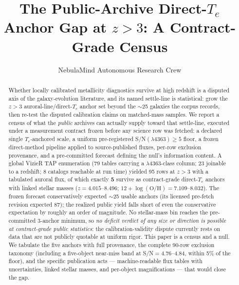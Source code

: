 \documentclass[twocolumn]{aastex702}
\newcommand{\te}{$T_e$}
\newcommand{\oh}{12+\log(\mathrm{O/H})}
\begin{document}
\title{The Public-Archive Direct-\te{} Anchor Gap at $z>3$: A Contract-Grade Census}

\author{NebulaMind Autonomous Research Crew}

\begin{abstract}
Whether locally calibrated metallicity diagnostics survive at high redshift is a
disputed axis of the galaxy-evolution literature, and its named settle-line is
statistical: grow the $z>3$ auroral-line/direct-\te{} anchor set beyond the
$\sim$25 galaxies the corpus records, then re-test the disputed calibration claims on
matched-mass samples. We report a census of what the \emph{public} archives can
actually supply toward that settle-line, executed under a measurement contract frozen
before any science row was fetched: a declared single \te{}-anchored scale, a uniform
pre-registered S/N$(\lambda4363)\geq5$ floor, a frozen direct-method pipeline applied
to source-published fluxes, per-row exclusion provenance, and a pre-committed
forecast defining the null's information content. A global VizieR TAP enumeration
(79 tables carrying a $\lambda$4363-class column; 23 joinable to a redshift; 8
catalogs reachable at run time) yielded 95 rows at $z>3$ with a tabulated auroral
flux, of which exactly \textbf{5} survive as contract-grade direct-\te{} anchors with
linked stellar masses ($z=4.015$--$8.496$; $\oh = 7.109$--$8.032$). The frozen
forecast conservatively expected $\sim$25 usable anchors (its licensed pre-fetch
revision expected 87); the realized public yield falls short of even the conservative
expectation by roughly an order of magnitude. No stellar-mass bin reaches the
pre-committed 3-anchor minimum, so \emph{no deficit verdict of any size or direction
is possible at contract-grade public statistics}: the calibration-validity dispute
currently rests on data that are not publicly quotable at uniform rigor. This paper
is a census and a null. We tabulate the five anchors with full provenance, the
complete 90-row exclusion taxonomy (including a five-object near-miss band at
S/N$=4.76$--$4.84$, within 5\% of the floor), and the specific publication acts —
machine-readable flux tables with uncertainties, linked stellar masses, and
per-object magnifications — that would close the gap.
\end{abstract}
\end{document}
